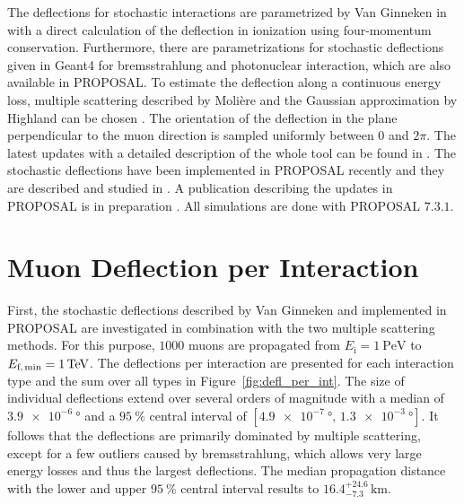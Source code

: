 \documentclass[pdflatex, sn-mathphys]{sn-jnl}%
\theoremstyle{thmstyleone}%
\theoremstyle{thmstyletwo}%
\theoremstyle{thmstylethree}%
\begin{document}
The deflections for stochastic interactions are parametrized by Van Ginneken 
in \cite{Van_Ginneken} with a direct calculation of the deflection in 
ionization using four-momentum conservation. 
Furthermore, there are parametrizations for stochastic deflections given in Geant4 \cite{GEANT4} 
for bremsstrahlung and photonuclear interaction, which 
are also available in PROPOSAL.
To estimate the deflection along 
a continuous energy loss, multiple scattering described by Molière 
\cite{moliere_scattering} and the Gaussian approximation by Highland 
can be chosen \cite{HIGHLAND_1975}. 
The orientation of the deflection in the plane perpendicular to the muon direction is 
sampled uniformly between $0$ and $2\pi$.
The latest updates with a detailed description of the whole tool can be found 
in \cite{phd_soedingrekso}. 
The stochastic deflections have been implemented in PROPOSAL recently and they are 
described and studied in \cite{Gutjahr_2021}.
A publication describing the 
updates in PROPOSAL is in preparation \cite{Alameddine_2022}.
All simulations are done with PROPOSAL $7.3.1$.

\section{Muon Deflection per Interaction}\label{sec:defl_per_int}
First, the stochastic deflections described by Van Ginneken \cite{Van_Ginneken} 
and implemented 
in PROPOSAL are investigated in combination with the two multiple scattering methods. 
For this purpose, $\num{1000}$ muons are propagated from $E_{\text{i}} = \SI{1}{\peta\electronvolt}$ to $E_{\text{f,\,min}} = \SI{1}{\tera\electronvolt}$.
The deflections per interaction are presented 
for each interaction type and the sum over all types in Figure~\ref{fig:defl_per_int}. 
The size of individual deflections 
extend over several orders of magnitude with a median of $\SI{3.9e-6}{\degree}$
and a $\SI{95}{\percent}$ central interval of $[\SI{4.9e-7}{\degree}, \,\SI{1.3e-3}{\degree}]$. 
It follows that the deflections are primarily dominated by multiple scattering, except for a few outliers caused by bremsstrahlung, which 
allows very large energy losses and thus the largest deflections.
The median propagation distance with the lower and upper $\SI{95}{\percent}$ 
central interval results to $16.4_{-7.3}^{+24.6}\,\si{\kilo\meter}$.
\end{document}
